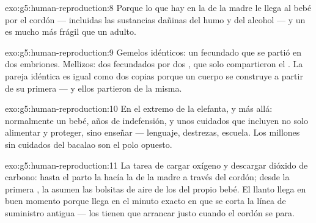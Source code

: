 \begin{solution}{exo:g5:human-reproduction:8}
Porque lo que hay en la  de la madre le llega al bebé por el
cordón --- incluidas las sustancias dañinas del humo y del alcohol ---
y un  es mucho más frágil que un adulto.
\end{solution}

\begin{solution}{exo:g5:human-reproduction:9}
Gemelos idénticos: un  fecundado que se partió en dos embriones.
Mellizos: dos  fecundados por dos , que solo
compartieron el . La pareja idéntica es igual como dos copias
porque un cuerpo se construye a partir de su primera  --- y ellos
partieron de la misma.
\end{solution}

\begin{solution}{exo:g5:human-reproduction:10}
En el extremo de la elefanta, y más allá: normalmente un bebé, años de
indefensión, y unos cuidados que incluyen no solo alimentar y proteger,
sino enseñar --- lenguaje, destrezas, escuela. Los millones sin
cuidados del bacalao son el polo opuesto.
\end{solution}

\begin{solution}{exo:g5:human-reproduction:11}
La tarea de cargar oxígeno y descargar dióxido de carbono: hasta el
parto la hacía la  de la madre a través del cordón; desde la
primera , la asumen las bolsitas de aire de los 
del propio bebé. El llanto llega en buen momento porque llega en el
minuto exacto en que se corta la línea de suministro antigua --- los
 tienen que arrancar justo cuando el cordón se para.
\end{solution}

